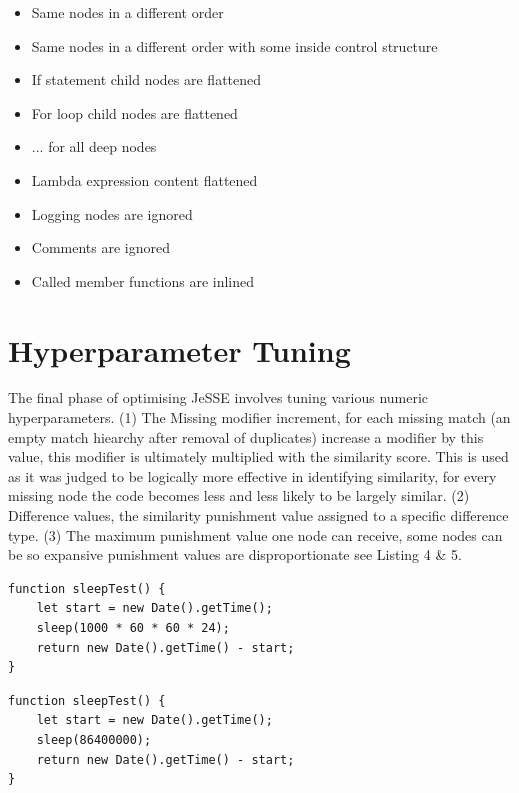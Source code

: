 \documentclass[jou,apacite]{apa6}
\begin{document}
\begin{itemize}
  		\setlength\itemsep{-0.2em}
		\item Same nodes in a different order
		\item Same nodes in a different order with some inside control structure 
		\item If statement child nodes are flattened
		\item For loop child nodes are flattened
		\item ... for all deep nodes
		\item Lambda expression content flattened
		\item Logging nodes are ignored
		\item Comments are ignored
		\item Called member functions are inlined
	\end{itemize}

\clearpage

\section{Hyperparameter Tuning}
The final phase of optimising JeSSE involves tuning various numeric hyperparameters. (1) The Missing modifier increment, for each missing match (an empty match hiearchy after removal of duplicates) increase a modifier by this value, this modifier is ultimately multiplied with the similarity score. This is used as it was judged to be logically more effective in identifying similarity, for every missing node the code becomes less and less likely to be largely similar. (2) Difference values, the similarity punishment value assigned to a specific difference type. (3) The maximum punishment value one node can receive, some nodes can be so expansive punishment values are disproportionate see Listing 4 \& 5.

\begin{lstlisting}[caption=Function returning contents of previous call expression]
function sleepTest() {
    let start = new Date().getTime();
    sleep(1000 * 60 * 60 * 24);
    return new Date().getTime() - start;
}
\end{lstlisting}

\begin{lstlisting}[caption=Function returning contents of previous call expression]
function sleepTest() {
    let start = new Date().getTime();
    sleep(86400000);
    return new Date().getTime() - start;
}

\end{lstlisting}
\end{document}
